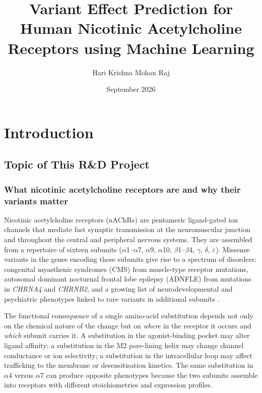 \documentclass[rnd]{mas_proposal}
\title{Variant Effect Prediction for \\ Human Nicotinic Acetylcholine \\ Receptors using Machine Learning}
\author{Hari Krishna Mohan Raj}
\date{September 2026}
\begin{document}
\maketitle

\pagestyle{plain}

\section{Introduction}

\subsection{Topic of This R\&D Project}

\subsubsection{What nicotinic acetylcholine receptors are and why their variants matter}
Nicotinic acetylcholine receptors (nAChRs) are pentameric ligand-gated
ion channels that mediate fast synaptic transmission at the neuromuscular
junction and throughout the central and peripheral nervous systems. They
are assembled from a repertoire of sixteen subunits ($\alpha$1--$\alpha$7,
$\alpha$9, $\alpha$10, $\beta$1--$\beta$4, $\gamma$, $\delta$, $\varepsilon$).
Missense variants in the genes encoding these subunits give rise to a
spectrum of disorders: congenital myasthenic syndromes (CMS) from
muscle-type receptor mutations, autosomal dominant nocturnal frontal lobe
epilepsy (ADNFLE) from mutations in \emph{CHRNA4} and \emph{CHRNB2}, and a
growing list of neurodevelopmental and psychiatric phenotypes linked to
rare variants in additional subunits \cite{cms_review,schaaf2011}.

The functional consequence of a single amino-acid substitution depends not
only on the chemical nature of the change but on \emph{where} in the receptor
it occurs and \emph{which} subunit carries it. A substitution in the
agonist-binding pocket may alter ligand affinity; a substitution in the M2
pore-lining helix may change channel conductance or ion selectivity; a
substitution in the intracellular loop may affect trafficking to the membrane
or desensitisation kinetics. The same substitution in $\alpha$4 versus
$\alpha$7 can produce opposite phenotypes because the two subunits assemble
into receptors with different stoichiometries and expression profiles.
\end{document}
